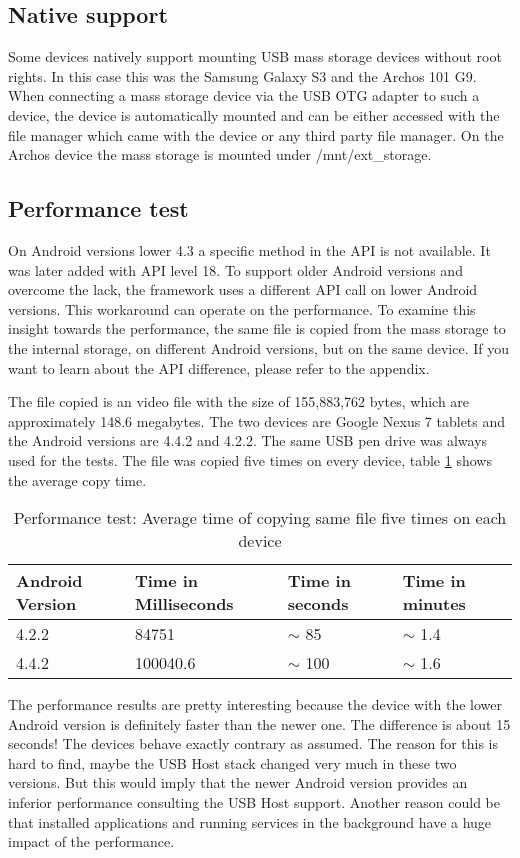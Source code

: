 \subsection{Native support}

Some devices natively support mounting USB mass storage devices without root rights. In this case this was the Samsung Galaxy S3 and the Archos 101 G9. When connecting a mass storage device via the USB OTG adapter to such a device, the device is automatically mounted and can be either accessed with the file manager which came with the device or any third party file manager. On the Archos device the mass storage is mounted under /mnt/ext\_storage.

\subsection{Performance test}

On Android versions lower 4.3 a specific method in the API is not available. It was later added with API level 18. To support older Android versions and overcome the lack, the framework uses a different API call on lower Android versions. This workaround can operate on the performance. To examine this insight towards the performance, the same file is copied from the mass storage to the internal storage, on different Android versions, but on the same device. If you want to learn about the API difference, please refer to the appendix.

The file copied is an video file with the size of 155,883,762 bytes, which are approximately 148.6 megabytes. The two devices are Google Nexus 7 tablets and the Android versions are 4.4.2 and 4.2.2. The same USB pen drive was always used for the tests. The file was copied five times on every device, table \ref{table:performance_test} shows the average copy time.

\begin{table}[ht]
\caption{Performance test: Average time of copying same file five times on each device}
\centering
\begin{tabular}{|l|l|l|l|}
\hline\hline
\textbf{Android Version} & \textbf{Time in Milliseconds} & \textbf{Time in seconds} & \textbf{Time in minutes} \\ \hline
4.2.2 & 84751 & $\sim$ 85 & $\sim$ 1.4 \\ \hline
4.4.2 & 100040.6 & $\sim$ 100 & $\sim$ 1.6 \\ \hline
\end{tabular}
\label{table:performance_test}
\end{table}

The performance results are pretty interesting because the device with the lower Android version is definitely faster than the newer one. The difference is about 15 seconds! The devices behave exactly contrary as assumed. The reason for this is hard to find, maybe the USB Host stack changed very much in these two versions. But this would imply that the newer Android version provides an inferior performance consulting the USB Host support. Another reason could be that installed applications and running services in the background have a huge impact of the performance.